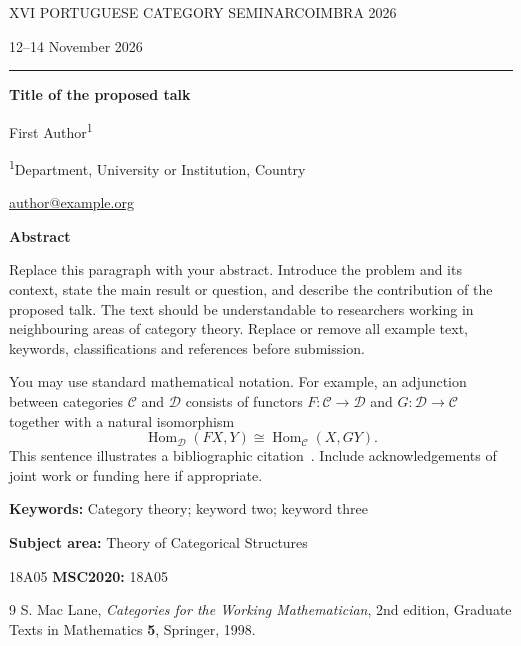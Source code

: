 \documentclass[11pt,a4paper]{article}
\makeatletter
\newcommand{\talktitle}{Title of the proposed talk}
\newcommand{\talkauthors}{First Author\textsuperscript{1}}
\newcommand{\talkaffiliations}{%
  \textsuperscript{1}Department, University or Institution, Country}
\newcommand{\talkemail}{author@example.org}
\newcommand{\talkkeywords}{Category theory; keyword two; keyword three}
\newcommand{\talksubject}{Theory of Categorical Structures}
\newcommand{\talkmsc}{18A05} %
\makeatother
\begin{document}
{\small\sffamily\color{PCSGold}
 XVI PORTUGUESE CATEGORY SEMINAR\hfill COIMBRA 2026\par}
\vspace{0.2em}
{\small\sffamily\color{PCSGray}12--14 November 2026\par}
{\color{PCSGold}\rule{\linewidth}{0.7pt}}

\vspace{1.5em}
{\LARGE\bfseries \talktitle\par}
\vspace{0.6em}
{\large \talkauthors\par}
\vspace{0.2em}
{\small\color{PCSGray}\talkaffiliations\par}
{\small\href{mailto:\talkemail}{\talkemail}\par}

\vspace{1.1em}
{\large\bfseries Abstract\par}

Replace this paragraph with your abstract. Introduce the problem and its
context, state the main result or question, and describe the contribution
of the proposed talk. The text should be understandable to researchers
working in neighbouring areas of category theory. Replace or remove all
example text, keywords, classifications and references before submission.

You may use standard mathematical notation. For example, an adjunction
between categories $\mathcal{C}$ and $\mathcal{D}$ consists of functors
$F\colon\mathcal{C}\to\mathcal{D}$ and
$G\colon\mathcal{D}\to\mathcal{C}$ together with a natural isomorphism
\[
  \operatorname{Hom}_{\mathcal{D}}(FX,Y)
  \cong
  \operatorname{Hom}_{\mathcal{C}}(X,GY).
\]
This sentence illustrates a bibliographic citation~\cite{maclane}.
Include acknowledgements of joint work or funding here if appropriate.

\vspace{0.7em}
{\small
 \textbf{Keywords:} \talkkeywords\par
 \textbf{Subject area:} \talksubject\par
 \ifx\talkmsc\empty\else
   \textbf{MSC2020:} \talkmsc\par
 \fi
}

\renewcommand{\refname}{References}
\begin{thebibliography}{9}
\small
{}
S. Mac Lane, \emph{Categories for the Working Mathematician},
2nd edition, Graduate Texts in Mathematics \textbf{5}, Springer, 1998.
\end{thebibliography}
\end{document}
